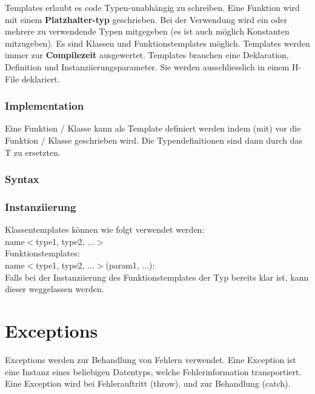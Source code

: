 Templates erlaubt es code Typen-unabhängig zu schreiben. 
Eine Funktion wird mit einem \textbf{Platzhalter-typ} geschrieben. 
Bei der Verwendung wird ein oder mehrere zu verwendende Typen mitgegeben (es ist auch möglich Konstanten mitzugeben). 
Es sind Klassen und Funktionstemplates möglich. 
Templates werden immer zur \textbf{Compilezeit} ausgewertet. 
Templates brauchen eine Deklaration, Definition und Instanziierungsparameter. 
Sie werden ausschliesslich in einem H-File deklariert.

\subsubsection{Implementation}

Eine Funktion / Klasse kann als Template definiert werden indem  (mit\say{$<>$}) vor die Funktion / Klasse geschrieben wird. 
Die Typendefinitionen sind dann durch das T zu ersetzten. 



\subsubsection{Syntax}



\subsubsection{Instanziierung}

Klassentemplates können wie folgt verwendet werden:\\

name$<$type1, type2, ...$>$\\

Funktionstemplates:\\

name$<$type1, type2, ...$>$(param1, ...);\\

Falls bei der Instanziierung des Funktionstemplates der Typ bereits klar ist, kann dieser weggelassen werden. 

\section{Exceptions}

Exceptions werden zur Behandlung von Fehlern verwendet. 
Eine Exception ist eine Instanz eines beliebigen Datentyps, welche Fehlerinformation transportiert. 
Eine Exception wird bei Fehlerauftritt  (throw), und zur Behandlung  (catch).


